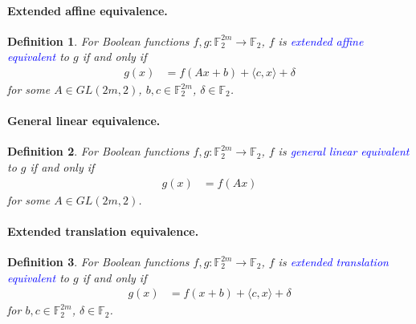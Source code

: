 \documentclass[12pt,a4paper]{article}
\newcommand{\mb}[1]{\mathbb{#1}}
\newcommand{\F}{\mb{F}}
\newcommand{\To}{\rightarrow}
\newcommand{\Emph}[1]{\emph{\textcolor{blue}{#1}}}
\newtheorem{Definition}{Definition}
\begin{document}
\paragraph*{Extended affine equivalence.}

\begin{Definition}
For Boolean functions $f,g : \F_2^{2m} \To \F_2$,
$f$ is \Emph{extended affine equivalent} to $g$ \cite[Section 1.4]{Tok15bent} if and only if
\begin{align*}
g(x) &= f(A x + b) + \langle c, x \rangle + \delta
\end{align*}
for some $A \in GL(2m,2)$, $b, c \in \F_2^{2m}$, $\delta \in \F_2$.
\end{Definition}

\paragraph*{General linear equivalence.}

\begin{Definition}
For Boolean functions $f,g : \F_2^{2m} \To \F_2$,
$f$ is \Emph{general linear equivalent} to $g$ if and only if
\begin{align*}
g(x) &= f(A x)
\end{align*}
for some $A \in GL(2m,2)$.
\end{Definition}

\paragraph*{Extended translation equivalence.}

\begin{Definition}
For Boolean functions $f,g : \F_2^{2m} \To \F_2$,
$f$ is \Emph{extended translation equivalent} to $g$ if and only if
\begin{align*}
g(x) &= f(x + b) + \langle c, x \rangle + \delta
\end{align*}
for $b, c \in \F_2^{2m}$, $\delta \in \F_2$.
\end{Definition}

\end{document}

